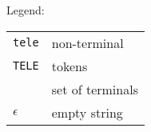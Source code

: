 \documentclass[a4paper, 12pt]{report}
\begin{document}


\newpage
{\huge Legend:}\\

\begin{tabular}{l l}
	{\tt tele} 	&	non-terminal\\ 
	{\tt TELE}	&	tokens\\
	{\tt \fbox{boxed}}&	set of terminals\\
	{\tt $\epsilon$}&	empty string\\
\end{tabular}
	
\end{document}
